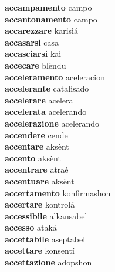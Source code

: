 \textbf{accampamento } campo \\
\textbf{accantonamento } campo \\
\textbf{accarezzare } karisiá \\
\textbf{accasarsi } casa \\
\textbf{accasciarsi } kai \\
\textbf{accecare } blèndu \\
\textbf{acceleramento } aceleracion \\
\textbf{accelerante } catalisado \\
\textbf{accelerare } acelera \\
\textbf{accelerata } acelerando \\
\textbf{accelerazione } acelerando \\
\textbf{accendere } cende \\
\textbf{accentare } aksènt \\
\textbf{accento } aksènt \\
\textbf{accentrare } atraé \\
\textbf{accentuare } aksènt \\
\textbf{accertamento } konfirmashon \\
\textbf{accertare } kontrolá \\
\textbf{accessibile } alkansabel \\
\textbf{accesso } ataká \\
\textbf{accettabile } aseptabel \\
\textbf{accettare } konsentí \\
\textbf{accettazione } adopshon \\
